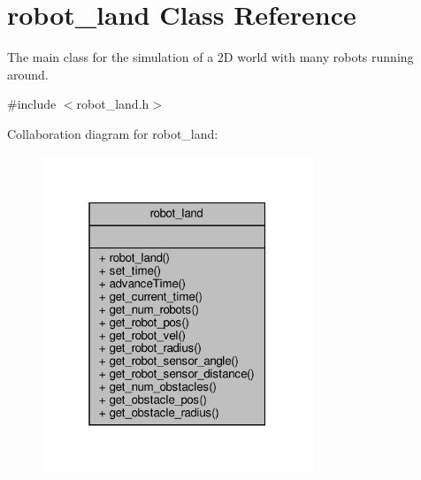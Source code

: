 \hypertarget{classrobot__land}{}\section{robot\+\_\+land Class Reference}
\label{classrobot__land}


The main class for the simulation of a 2D world with many robots running around.  




{\ttfamily \#include $<$robot\+\_\+land.\+h$>$}



Collaboration diagram for robot\+\_\+land\+:\nopagebreak
\begin{figure}[H]
\begin{center}
\leavevmode
\includegraphics[width=229pt]{classrobot__land__coll__graph}
\end{center}
\end{figure}
